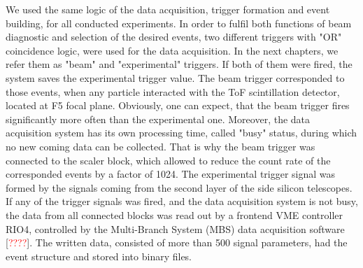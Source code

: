We used the same logic of the data acquisition, trigger formation and event building, for all conducted experiments.
In order to fulfil both functions of beam diagnostic and selection of the desired events, two different triggers with "OR" coincidence logic, were used for the data acquisition.
In the next chapters, we refer them as "beam" and "experimental" triggers.
If both of them were fired, the system saves the experimental trigger value.
The beam trigger corresponded to those events, when any particle interacted with the ToF scintillation detector, located at F5 focal plane. 
Obviously, one can expect, that the beam trigger fires significantly more often than the experimental one.
Moreover, the data acquisition system has its own processing time, called "busy" status, during which no new coming data can be collected.
That is why the beam trigger was connected to the scaler block, which allowed to reduce the count rate of the corresponded events by a factor of 1024.
The experimental trigger signal was formed by the signals coming from the second layer of the side silicon telescopes.
If any of the trigger signals was fired, and the data acquisition system is not busy, the data from all connected blocks was read out by a frontend VME controller RIO4, controlled by the Multi-Branch System (MBS) data acquisition software [\textcolor{red}{????}].
The written data, consisted of more than 500 signal parameters, had the event structure and stored into binary files.
